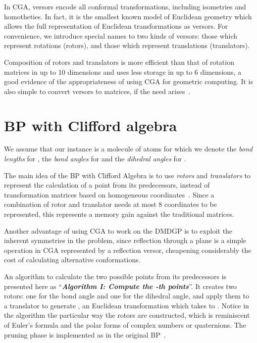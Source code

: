 \documentclass{proc}
\begin{document}
In CGA, versors encode all conformal transformations, including isometries and homotheties. In fact, it is the smallest known model of Euclidean geometry which allows the full representation of Euclidean transformations as versors. For convenience, we introduce special names to two kinds of versors: those which represent rotations (rotors), and those which represent translations (translators).

Composition of rotors and translators is more efficient than that of rotation matrices in up to 10 dimensions and uses less storage in up to 6 dimensions, a good evidence of the appropriateness of using CGA for geometric computing. It is also simple to convert versors to matrices, if the need arises~\cite{Dorst2007}.









\section{BP with Clifford algebra}
We assume that our instance is a molecule of  atoms for which we denote the \textit{bond lengths}  for , the \textit{bond angles}  for  and the \textit{dihedral angles}  for .

The main idea of the BP with Clifford Algebra is to use \textit{rotors} and \textit{translators} to represent the calculation of a point from its predecessors, instead of transformation matrices based on homogeneous coordinates~\cite{dmdgp}. Since a combination of rotor and translator needs at most 8 coordinates to be represented, this represents a memory gain against the traditional  matrices.


Another advantage of using CGA to work on the DMDGP is to exploit the inherent symmetries in the problem, since reflection through a plane is a simple operation in CGA represented by a reflection versor, cheapening considerably the cost of calculating alternative conformations.

An algorithm to calculate the two possible points from its predecessors is presented here as ``\textit{\textbf{Algorithm I: Compute the -th points}}''. It creates two rotors: one for the bond angle and one for the dihedral angle, and apply them to a translator to generate , an Euclidean transformation which takes  to . Notice in the algorithm the particular way the rotors are constructed, which is reminiscent of Euler's formula and the polar forms of complex numbers or quaternions.
The pruning phase is implemented as in the original BP~\cite{survey}.
\end{document}
